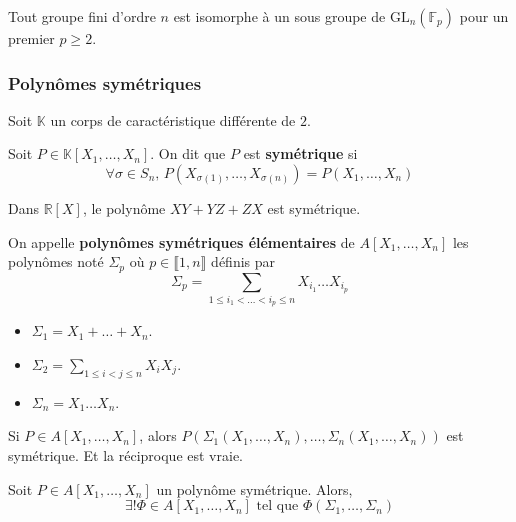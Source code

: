 	\begin{corollary}
		Tout groupe fini d'ordre $n$ est isomorphe à un sous groupe de $\mathrm{GL}_n(\mathbb{F}_p)$ pour un premier $p \geq 2$.
	\end{corollary}

	\subsubsection{Polynômes symétriques}


	Soit $\mathbb{K}$ un corps de caractéristique différente de $2$.

	\begin{definition}
		Soit $P \in \mathbb{K}[X_1, \dots, X_n]$. On dit que $P$ est \textbf{symétrique} si
		\[ \forall \sigma \in S_n, \, P(X_{\sigma(1)}, \dots, X_{\sigma(n)}) = P(X_1, \dots, X_n) \]
	\end{definition}

	\begin{example}
		Dans $\mathbb{R}[X]$, le polynôme $XY + YZ + ZX$ est symétrique.
	\end{example}

	\begin{definition}
		On appelle \textbf{polynômes symétriques élémentaires} de $A[X_1, \dots, X_n]$ les polynômes noté $\Sigma_p$ où $p \in \llbracket 1, n \rrbracket$ définis par
		\[ \Sigma_p = \sum_{1 \leq i_1 < \dots < i_p \leq n} X_{i_1} \dots X_{i_p} \]
	\end{definition}

	\begin{example}
		\begin{itemize}
			\item $\Sigma_1 = X_1 + \dots + X_n$.
			\item $\Sigma_2 = \sum_{1 \leq i < j \leq n} X_i X_j$.
			\item $\Sigma_n = X_1 \dots X_n$.
		\end{itemize}
	\end{example}

	\begin{remark}
		Si $P \in A[X_1, \dots, X_n]$, alors $P(\Sigma_1(X_1, \dots, X_n), \dots, \Sigma_n(X_1, \dots, X_n))$ est symétrique. Et la réciproque est vraie.
	\end{remark}

	\begin{theorem}
		Soit $P \in A[X_1, \dots, X_n]$ un polynôme symétrique. Alors,
		\[ \exists! \Phi \in A[X_1, \dots, X_n] \text{ tel que } \Phi(\Sigma_1, \dots, \Sigma_n) \]
	\end{theorem}

